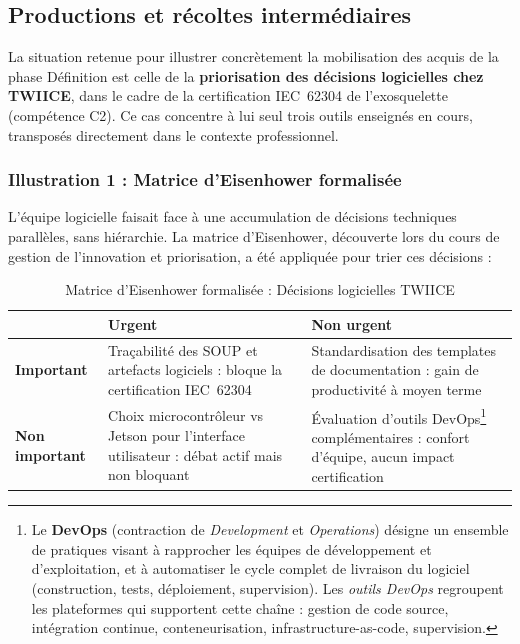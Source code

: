 \subsection{Productions et récoltes intermédiaires}

La situation retenue pour illustrer concrètement la mobilisation des acquis de la phase Définition est celle de la \textbf{priorisation des décisions logicielles chez TWIICE}, dans le cadre de la certification IEC~62304 de l'exosquelette (compétence C2). Ce cas concentre à lui seul trois outils enseignés en cours, transposés directement dans le contexte professionnel.

\subsubsection{Illustration 1 : Matrice d'Eisenhower formalisée}

L'équipe logicielle faisait face à une accumulation de décisions techniques parallèles, sans hiérarchie. La matrice d'Eisenhower, découverte lors du cours de gestion de l'innovation et priorisation, a été appliquée pour trier ces décisions :

\begin{table}[h!]
  \centering
  \begin{tabular}{|p{3cm}|p{5.5cm}|p{5.5cm}|}
    \hline
    & \textbf{Urgent} & \textbf{Non urgent} \\
    \hline
    \textbf{Important}
      & Traçabilité des SOUP et artefacts logiciels : bloque la certification IEC~62304
      & Standardisation des templates de documentation : gain de productivité à moyen terme \\
    \hline
    \textbf{Non important}
      & Choix microcontrôleur vs Jetson pour l'interface utilisateur : débat actif mais non bloquant
      & Évaluation d'outils DevOps\footnote{Le \textbf{DevOps} (contraction de \emph{Development} et \emph{Operations}) désigne un ensemble de pratiques visant à rapprocher les équipes de développement et d'exploitation, et à automatiser le cycle complet de livraison du logiciel (construction, tests, déploiement, supervision). Les \emph{outils DevOps} regroupent les plateformes qui supportent cette chaîne : gestion de code source, intégration continue, conteneurisation, infrastructure-as-code, supervision.} complémentaires : confort d'équipe, aucun impact certification \\
    \hline
  \end{tabular}
  \caption{Matrice d'Eisenhower formalisée : Décisions logicielles TWIICE}
  \label{tab:eisenhower-illustration1}
\end{table}

